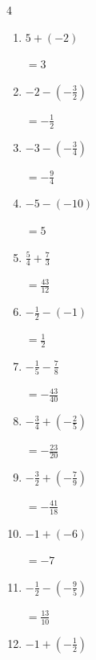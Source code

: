 \begin{multicols}{4}
\begin{enumerate}
        $\displaystyle =\frac{1}{28}$

  \item $\displaystyle 5 + \left(-2\right)$

        $\displaystyle =3$

  \item $\displaystyle -2 - \left(-\frac{3}{2}\right)$

        $\displaystyle =-\frac{1}{2}$

  \item $\displaystyle -3 - \left(-\frac{3}{4}\right)$

        $\displaystyle =-\frac{9}{4}$

  \item $\displaystyle -5 - \left(-10\right)$

        $\displaystyle =5$

  \item $\displaystyle \frac{5}{4} + \frac{7}{3}$

        $\displaystyle =\frac{43}{12}$

  \item $\displaystyle -\frac{1}{2} - \left(-1\right)$

        $\displaystyle =\frac{1}{2}$

  \item $\displaystyle -\frac{1}{5} - \frac{7}{8}$

        $\displaystyle =-\frac{43}{40}$

\columnbreak %

\resetques

  \item $\displaystyle -\frac{3}{4} + \left(-\frac{2}{5}\right)$

        $\displaystyle =-\frac{23}{20}$

  \item $\displaystyle -\frac{3}{2} + \left(-\frac{7}{9}\right)$

        $\displaystyle =-\frac{41}{18}$

  \item $\displaystyle -1 + \left(-6\right)$

        $\displaystyle =-7$

  \item $\displaystyle -\frac{1}{2} - \left(-\frac{9}{5}\right)$

        $\displaystyle =\frac{13}{10}$

  \item $\displaystyle -1 + \left(-\frac{1}{2}\right)$


\end{enumerate}
\end{multicols}
